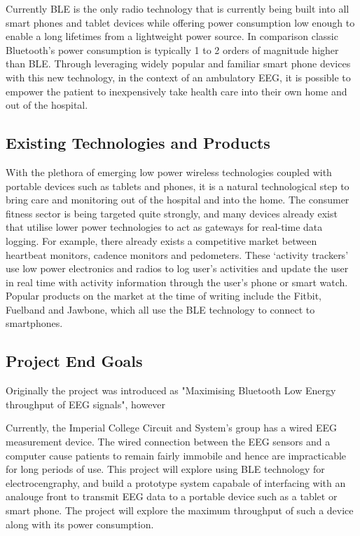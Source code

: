 \documentclass[]{article}
\begin{document}
Currently \ac{BLE} is the only radio technology that is currently being built into all smart phones and tablet devices while offering power consumption low enough to enable a long lifetimes from a lightweight power source. In comparison classic Bluetooth’s power consumption is typically 1 to 2 orders of magnitude higher than BLE. Through leveraging widely popular and familiar smart phone devices with this new technology, in the context of an ambulatory EEG, it is possible to empower the patient to inexpensively take health care into their own home and out of the hospital.


\subsection{Existing Technologies and Products}


With the plethora of emerging low power wireless technologies coupled with portable devices such as tablets and phones, it is a natural technological step to bring care and monitoring out of the hospital and into the home. The consumer fitness sector is being targeted quite strongly, and many devices already exist that utilise lower power technologies to act as gateways for real-time data logging. For example, there already exists a competitive market between heartbeat monitors, cadence monitors and pedometers. These ‘activity trackers’ use low power electronics and radios to log user’s activities and update the user in real time with activity information through the user’s phone or smart watch. Popular products on the market at the time of writing include the Fitbit, Fuelband and Jawbone, which all use the \ac{BLE} technology to connect to smartphones.

\subsection{Project End Goals}
Originally the project was introduced as "Maximising Bluetooth Low Energy throughput of \ac{EEG} signals", however 

Currently, the Imperial College Circuit and System's group has a wired \ac{EEG} measurement device. The wired connection between the EEG sensors and a computer cause patients to remain fairly immobile and hence are impracticable for long periods of use. This project will explore using \ac{BLE} technology for electrocengraphy, and build a prototype system capabale of interfacing with an analouge front to transmit \ac{EEG} data to a portable device such as a tablet or smart phone.  The project will explore the maximum throughput of such a device along with its power consumption.
\end{document}
